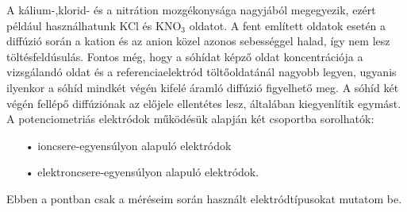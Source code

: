 A kálium-,klorid- és a nitrátion mozgékonysága nagyjából megegyezik, ezért például használhatunk KCl és KNO$_3$ oldatot.
A fent említett oldatok esetén a diffúzió során a kation és az anion közel azonos sebességgel halad, így nem lesz töltésfeldúsulás. Fontos még, hogy a sóhídat képző oldat koncentrációja a vizsgálandó oldat és a referenciaelektród töltőoldatánál nagyobb legyen, ugyanis ilyenkor a sóhíd mindkét végén kifelé áramló diffúzió figyelhető meg. A sóhíd két végén fellépő diffúziónak az előjele ellentétes lesz, általában kiegyenlítik egymást.\\
A potenciometriás elektródok működésük alapján két csoportba sorolhatók:
\begin{itemize}
\item[•]ioncsere-egyensúlyon alapuló elektródok
\item[•]elektroncsere-egyensúlyon alapuló elektródok.
\end{itemize} 
Ebben a pontban csak a méréseim során használt elektródtípusokat mutatom be.
